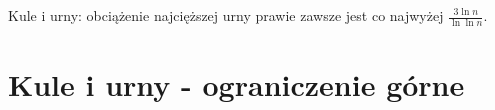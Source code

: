 {
\makeatletter
{}
\makeatother
\graphicspath{{../probabil}}

\begin{questiontext}
	Kule i urny: obciążenie najcięższej urny prawie zawsze jest co najwyżej \(\frac{3 \ln n}{\ln \ln n}\).
\end{questiontext}

\section{Kule i urny - ograniczenie górne}

}